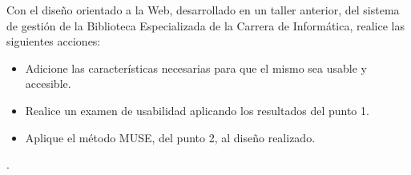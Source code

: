 Con el diseño orientado a la Web, desarrollado en un taller anterior, del sistema de gestión de la Biblioteca Especializada de la Carrera de Informática, realice las siguientes acciones:
\begin{itemize}
\item Adicione las características necesarias para que el mismo sea usable y accesible.
\item Realice un examen de usabilidad aplicando los resultados del punto 1.
\item Aplique el método MUSE, del punto 2, al diseño realizado. 
\end{itemize}
.
